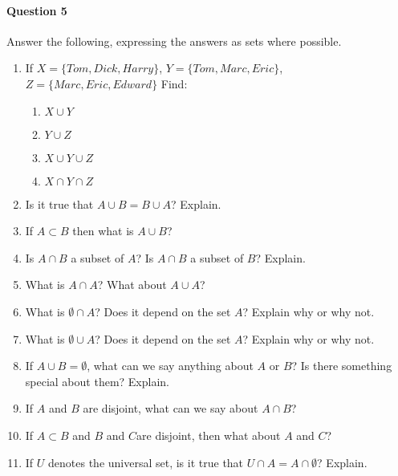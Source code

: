 \paragraph{Question 5} Answer the following, expressing the answers as sets where possible.
\begin{enumerate}
\item If $X=\{Tom, Dick, Harry\}$, $Y=\{Tom, Marc, Eric\}$, $Z=\{Marc, Eric, Edward\}$ Find:
\begin{enumerate}
\item $X \cup Y$
\vspace{3em}
\item $Y \cup Z$
\vspace{3em}
\item $X \cup Y \cup Z$
\vspace{3em}
\item $X \cap Y \cap Z$
\vspace{3em}
\end{enumerate}
\item Is it true that $A \cup B=B \cup A$? Explain. 
\vspace{5em}
\item If $A\subset B$ then what is $A \cup B$?
\vspace{5em}
\item Is $A \cap B$ a subset of $A$? Is $A \cap B$ a subset of $B$? Explain.
\vspace{5em}
\item What is $A \cap A$? What about $A \cup A$?
\vspace{5em}
\item What is $\emptyset \cap A$? Does it depend on the set $A$? Explain why or why not.
\vspace{5em}
\item What is $\emptyset \cup A$? Does it depend on the set $A$? Explain why or why not. 
\vspace{5em}
\item If $A \cup B=\emptyset$, what can we say anything about $A$ or $B$? Is there something special about them? Explain.
\vspace{5em}
\item If $A$ and $B$ are disjoint, what can we say about $A \cap B$?
\vspace{5em}
\item If $A\subset B$ and $B$ and $C$are disjoint, then what about $A$ and $C$?
\vspace{5em}
\item If $U$ denotes the universal set, is it true that $U \cap A=A \cap \emptyset$? Explain.
\vspace{5em}

\end{enumerate}



